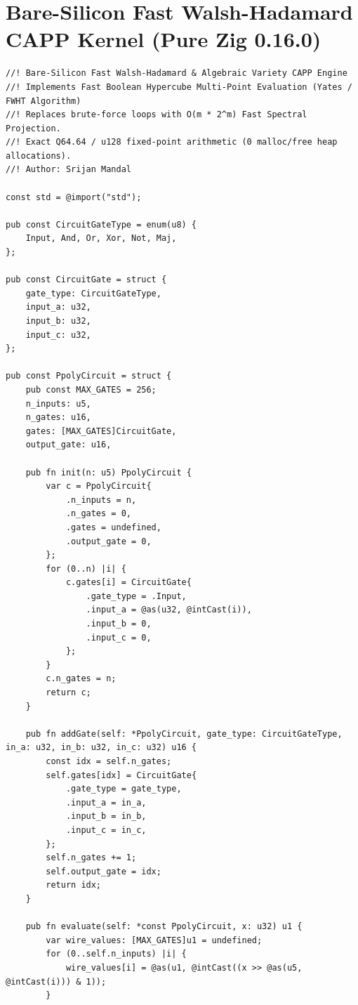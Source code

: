 \documentclass[11pt,a4paper]{article}
\theoremstyle{definition}
\theoremstyle{remark}
\begin{document}
\section{Bare-Silicon Fast Walsh-Hadamard CAPP Kernel (Pure Zig 0.16.0)}\label{app:ppoly_kernel}

\begin{lstlisting}
//! Bare-Silicon Fast Walsh-Hadamard & Algebraic Variety CAPP Engine
//! Implements Fast Boolean Hypercube Multi-Point Evaluation (Yates / FWHT Algorithm)
//! Replaces brute-force loops with O(m * 2^m) Fast Spectral Projection.
//! Exact Q64.64 / u128 fixed-point arithmetic (0 malloc/free heap allocations).
//! Author: Srijan Mandal

const std = @import("std");

pub const CircuitGateType = enum(u8) {
    Input, And, Or, Xor, Not, Maj,
};

pub const CircuitGate = struct {
    gate_type: CircuitGateType,
    input_a: u32,
    input_b: u32,
    input_c: u32,
};

pub const PpolyCircuit = struct {
    pub const MAX_GATES = 256;
    n_inputs: u5,
    n_gates: u16,
    gates: [MAX_GATES]CircuitGate,
    output_gate: u16,

    pub fn init(n: u5) PpolyCircuit {
        var c = PpolyCircuit{
            .n_inputs = n,
            .n_gates = 0,
            .gates = undefined,
            .output_gate = 0,
        };
        for (0..n) |i| {
            c.gates[i] = CircuitGate{
                .gate_type = .Input,
                .input_a = @as(u32, @intCast(i)),
                .input_b = 0,
                .input_c = 0,
            };
        }
        c.n_gates = n;
        return c;
    }

    pub fn addGate(self: *PpolyCircuit, gate_type: CircuitGateType, in_a: u32, in_b: u32, in_c: u32) u16 {
        const idx = self.n_gates;
        self.gates[idx] = CircuitGate{
            .gate_type = gate_type,
            .input_a = in_a,
            .input_b = in_b,
            .input_c = in_c,
        };
        self.n_gates += 1;
        self.output_gate = idx;
        return idx;
    }

    pub fn evaluate(self: *const PpolyCircuit, x: u32) u1 {
        var wire_values: [MAX_GATES]u1 = undefined;
        for (0..self.n_inputs) |i| {
            wire_values[i] = @as(u1, @intCast((x >> @as(u5, @intCast(i))) & 1));
        }


\end{lstlisting}
\end{document}
